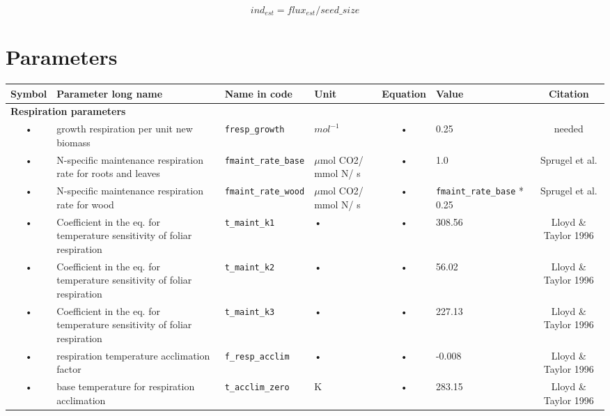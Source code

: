 \begin{equation}
ind_{est} = flux_{est} / seed\_size
\end{equation}



\begin{table}
\section{Parameters}\label{TabVegParam}

\begin{tabularx}{\linewidth}{|c|X|l|l|c|l|c|} %
\hline 
Symbol & Parameter long name & Name in code & Unit & Equation & Value & Citation \\ 
\hline 

\multicolumn{6}{l}{\bf Respiration parameters}\\
\hline
• & growth respiration per unit new biomass & \texttt{fresp\_growth} & $mol^{-1}$ & • & 0.25 & needed \\ 
• & N-specific maintenance respiration rate for roots and leaves & \texttt{fmaint\_rate\_base} & $\mu$mol CO2/ mmol N/ s & • & 1.0 & Sprugel et al. \\ 
• & N-specific maintenance respiration rate for wood & \texttt{fmaint\_rate\_wood} & $\mu$mol CO2/ mmol N/ s & • & \texttt{fmaint\_rate\_base} * 0.25 & Sprugel et al. \\ 
• & Coefficient in the eq. for temperature sensitivity of foliar respiration & \texttt{t\_maint\_k1} & • & • & 308.56 & Lloyd \& Taylor 1996 \\ 
• & Coefficient in the eq. for temperature sensitivity of foliar respiration & \texttt{t\_maint\_k2} & • & • & 56.02 & Lloyd \& Taylor 1996 \\ 
• & Coefficient in the eq. for temperature sensitivity of foliar respiration & \texttt{t\_maint\_k3} & • & • & 227.13 & Lloyd \& Taylor 1996 \\ 
• & respiration temperature acclimation factor & \texttt{f\_resp\_acclim} & • & • & -0.008 & Lloyd \& Taylor 1996 \\
• & base temperature for respiration acclimation & \texttt{t\_acclim\_zero} & K & • & 283.15 & Lloyd \& Taylor 1996 \\
\hline
\end{tabularx}
\end{table}



